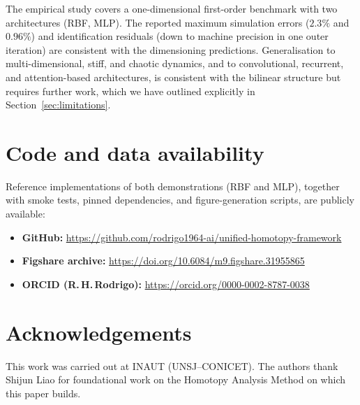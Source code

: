 \documentclass[preprint,12pt,numbers]{elsarticle}
\begin{document}
The empirical study covers a one-dimensional first-order benchmark with
two architectures (RBF, MLP). The reported maximum simulation errors
($2.3\%$ and $0.96\%$) and identification residuals (down to machine
precision in one outer iteration) are consistent with the dimensioning
predictions. Generalisation to multi-dimensional, stiff, and chaotic
dynamics, and to convolutional, recurrent, and attention-based
architectures, is consistent with the bilinear structure but requires
further work, which we have outlined explicitly in
Section~\ref{sec:limitations}.


\section*{Code and data availability}

Reference implementations of both demonstrations (RBF and MLP),
together with smoke tests, pinned dependencies, and figure-generation
scripts, are publicly available:

\begin{itemize}[nosep]
\item \textbf{GitHub:} \url{https://github.com/rodrigo1964-ai/unified-homotopy-framework}
\item \textbf{Figshare archive:} \url{https://doi.org/10.6084/m9.figshare.31955865}
\item \textbf{ORCID (R.\,H.\,Rodrigo):} \url{https://orcid.org/0000-0002-8787-0038}
\end{itemize}


\section*{Acknowledgements}

This work was carried out at INAUT (UNSJ--CONICET). The authors thank
Shijun Liao for foundational work on the Homotopy Analysis Method on
which this paper builds.


\end{document}
